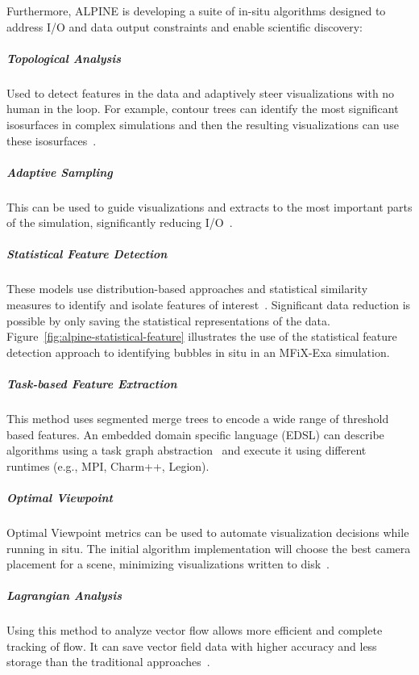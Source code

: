 
Furthermore, ALPINE is developing a suite of in-situ algorithms designed to address I/O and data output constraints and enable scientific discovery:
 

	\subparagraph{Topological Analysis} Used to detect features in the data and adaptively steer visualizations with no human in the loop.  For example, contour trees can identify the most significant isosurfaces in complex simulations and then the resulting visualizations can use these isosurfaces~\cite{alpine:Carr:TVCG19}.
	\subparagraph{Adaptive Sampling} This can be used to guide visualizations and extracts to the most important parts of the simulation, significantly reducing I/O~\cite{alpine:Biswas:ISAV18,alpine:Dutta:Entropy19,alpine:Liu:SC19poster}.  %
	\subparagraph{Statistical Feature Detection} These models use distribution-based approaches and statistical similarity measures to identify and isolate features of interest~\cite{alpine:Dutta:PVIS17,alpine:Dutta:VIS15}. Significant data reduction is possible by only saving the statistical representations of the data.  Figure~\ref{fig:alpine-statistical-feature} illustrates the use of the statistical feature detection approach to identifying bubbles in situ in an MFiX-Exa simulation.  
	\subparagraph{Task-based Feature Extraction} This method uses segmented merge trees to encode a wide range of threshold based features.  An embedded domain specific language (EDSL) can describe algorithms using a  task graph abstraction~\cite{alpine:Landge:SC14,alpine:Petruzza:IPDPS18} and execute it using different runtimes (e.g., MPI, Charm++, Legion).
	\subparagraph{Optimal Viewpoint} Optimal Viewpoint metrics can be used to automate visualization decisions while running in situ. The initial algorithm implementation will choose the best camera placement for a scene, minimizing visualizations written to disk~\cite{alpine:Bonaventura:Entropy18,alpine:Marsaglia:UOtech20}.  
	\subparagraph{Lagrangian Analysis} Using this method to analyze vector flow allows more efficient and complete tracking of flow.  It can save vector field data with higher accuracy and less storage than the traditional approaches~\cite{alpine:Sane:EGPGV18,alpine:Sane:EGPGV19,alpine:Binyahib:LDAV19}.


